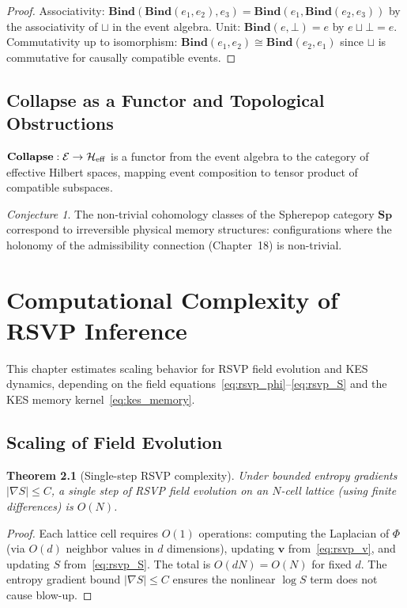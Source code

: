 \documentclass[11pt, openright, twoside]{book}
\theoremstyle{plain}
\newtheorem{theorem}{Theorem}[chapter]
\theoremstyle{definition}
\theoremstyle{remark}
\newtheorem{conjecture}[theorem]{Conjecture}
\newcommand{\vfield}{\mathbf{v}}
\newcommand{\Sfield}{S}
\newcommand{\Bind}{\mathbf{Bind}}
\newcommand{\Collapse}{\mathbf{Collapse}}
\begin{document}
\begin{proof}
Associativity: $\Bind(\Bind(e_1,e_2),e_3)=\Bind(e_1,\Bind(e_2,e_3))$ by the associativity
of $\sqcup$ in the event algebra. Unit: $\Bind(e,\bot)=e$ by $e\sqcup\bot=e$. Commutativity
up to isomorphism: $\Bind(e_1,e_2)\cong\Bind(e_2,e_1)$ since $\sqcup$ is commutative
for causally compatible events.
\end{proof}

\section{Collapse as a Functor and Topological Obstructions}

$\Collapse:\mathcal{E}\to\mathcal{H}_{\rm eff}$ is a functor from the event algebra to
the category of effective Hilbert spaces, mapping event composition to tensor product of
compatible subspaces.

\begin{conjecture}
The non-trivial cohomology classes of the Spherepop category $\mathbf{Sp}$ correspond to
irreversible physical memory structures: configurations where the holonomy of the
admissibility connection (Chapter~18) is non-trivial.
\end{conjecture}

\chapter{Computational Complexity of RSVP Inference}

\begin{depbox}
This chapter estimates scaling behavior for RSVP field evolution and KES dynamics,
depending on the field equations~\eqref{eq:rsvp_phi}--\eqref{eq:rsvp_S} and the KES
memory kernel~\eqref{eq:kes_memory}.
\end{depbox}

\section{Scaling of Field Evolution}

\begin{theorem}[Single-step RSVP complexity]
Under bounded entropy gradients $|\nabla\Sfield|\leq C$, a single step of RSVP field
evolution on an $N$-cell lattice (using finite differences) is $O(N)$.
\end{theorem}

\begin{proof}
Each lattice cell requires $O(1)$ operations: computing the Laplacian of $\Phi$ (via
$O(d)$ neighbor values in $d$ dimensions), updating $\vfield$ from~\eqref{eq:rsvp_v},
and updating $\Sfield$ from~\eqref{eq:rsvp_S}. The total is $O(dN)=O(N)$ for fixed $d$.
The entropy gradient bound $|\nabla\Sfield|\leq C$ ensures the nonlinear $\log\Sfield$
term does not cause blow-up.
\end{proof}
\end{document}
